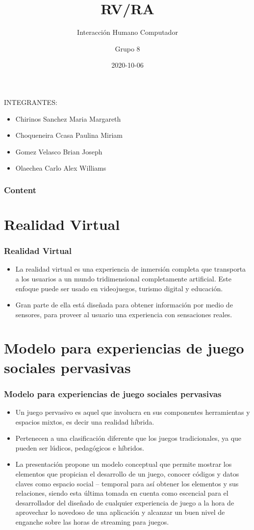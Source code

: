 \documentclass[11pt]{beamer}
\title[RV/RA]{\bf\Huge RV/RA}
\subtitle{Interacción Humano Computador}
\author[Grupo 8]
{
	Grupo 8 \inst{1}
}
\institute[UNSA]
{
\inst{1}%
System Engineering School\\
System Engineering and Informatic Department\\
Production and Services Faculty\\
San Agustin National University of Arequipa
}
\date[2020-10-06]{\scriptsize{2020-10-06}}
\begin{document}
\begin{frame}
\titlepage
\end{frame}

\begin{frame}
\center INTEGRANTES:
\center 

\begin{itemize}
\item Chirinos Sanchez Maria Margareth
\item Choqueneira Ccasa Paulina Miriam
\item Gomez Velasco Brian Joseph
\item Olaechea Carlo Alex Williams
\end{itemize}
\end{frame}


\begin{frame}
\frametitle{Content}
\tableofcontents
\end{frame}

\section{Realidad Virtual}
\begin{frame}
\frametitle{Realidad Virtual}
\begin{itemize}
\item La realidad virtual es una experiencia de inmersión completa que transporta a los usuarios a un mundo tridimensional completamente artificial. Este enfoque puede ser usado en videojuegos, turismo digital y educación.
\item Gran parte de ella está diseñada para obtener información por medio de sensores, para proveer al usuario una experiencia con sensaciones reales. 
\end{itemize}
\end{frame}


\section{Modelo para experiencias de juego sociales pervasivas}
\begin{frame}
\frametitle{Modelo para experiencias de juego sociales pervasivas}
\begin{itemize}
\item Un juego pervasivo es aquel que involucra en sus componentes herramientas y espacios mixtos, es decir una realidad híbrida.
\item Pertenecen a una clasificación diferente que los juegos tradicionales, ya que pueden ser lúdicos, pedagógicos e híbridos.
\item La presentación propone un modelo conceptual
que permite mostrar los elementos que propician el desarrollo de un juego, conocer códigos y datos claves como espacio social – temporal
para así obtener los elementos y sus relaciones, siendo esta última tomada en cuenta como escencial para el desarrollador del diseñado de
cualquier experiencia de juego a la hora de aprovechar lo novedoso
de  una aplicación y alcanzar un buen nivel de enganche sobre las horas de streaming para juegos. 
\end{itemize}
\end{frame}
\end{document}
